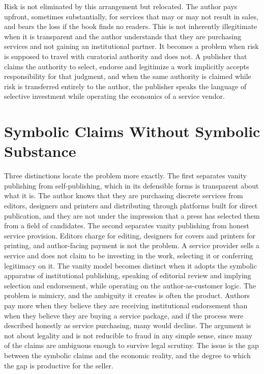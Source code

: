 \documentclass[12pt, a4paper]{article}
\begin{document}
Risk is not eliminated by this arrangement but relocated. The author pays upfront, sometimes substantially, for services that may or may not result in sales, and bears the loss if the book finds no readers. This is not inherently illegitimate when it is transparent and the author understands that they are purchasing services and not gaining an institutional partner. It becomes a problem when risk is supposed to travel with curatorial authority and does not. A publisher that claims the authority to select, endorse and legitimize a work implicitly accepts responsibility for that judgment, and when the same authority is claimed while risk is transferred entirely to the author, the publisher speaks the language of selective investment while operating the economics of a service vendor.

\section{Symbolic Claims Without Symbolic Substance}

Three distinctions locate the problem more exactly. The first separates vanity publishing from self-publishing, which in its defensible forms is transparent about what it is. The author knows that they are purchasing discrete services from editors, designers and printers and distributing through platforms built for direct publication, and they are not under the impression that a press has selected them from a field of candidates. The second separates vanity publishing from honest service provision. Editors charge for editing, designers for covers and printers for printing, and author-facing payment is not the problem. A service provider sells a service and does not claim to be investing in the work, selecting it or conferring legitimacy on it. The vanity model becomes distinct when it adopts the symbolic apparatus of institutional publishing, speaking of editorial review and implying selection and endorsement, while operating on the author-as-customer logic. The problem is mimicry, and the ambiguity it creates is often the product. Authors pay more when they believe they are receiving institutional endorsement than when they believe they are buying a service package, and if the process were described honestly as service purchasing, many would decline. The argument is not about legality and is not reducible to fraud in any simple sense, since many of the claims are ambiguous enough to survive legal scrutiny. The issue is the gap between the symbolic claims and the economic reality, and the degree to which the gap is productive for the seller.
\end{document}
